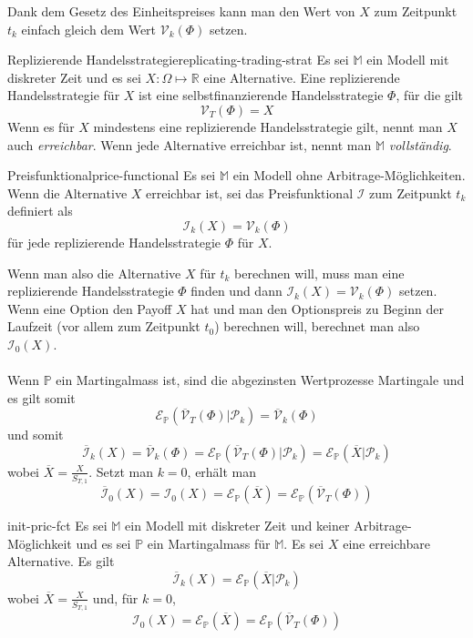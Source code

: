 \documentclass[11pt]{report} %
\begin{document}
Dank dem Gesetz des Einheitspreises kann man den Wert von $X$ zum Zeitpunkt $t_k$ einfach gleich dem Wert $\mathcal{V}_k(\Phi)$ setzen.
\begin{Definition}{Replizierende Handelsstrategie}{replicating-trading-strat}
    Es sei $\mathbb{M}$ ein Modell mit diskreter Zeit und es sei $X:\Omega \mapsto \mathbb{R}$ eine Alternative. Eine replizierende Handelsstrategie für $X$ ist eine selbstfinanzierende Handelsstrategie $\Phi$, für die gilt $$\mathcal{V}_T(\Phi)=X$$Wenn es für $X$ mindestens eine replizierende Handelsstrategie gilt, nennt man $X$ auch \textit{erreichbar}. Wenn jede Alternative erreichbar ist, nennt man $\mathbb{M}$ \textit{vollständig}.
\end{Definition}
\begin{Definition}{Preisfunktional}{price-functional}
    Es sei $\mathbb{M}$ ein Modell ohne Arbitrage-Möglichkeiten. Wenn die Alternative $X$ erreichbar ist, sei das Preisfunktional $\mathcal{I}$ zum Zeitpunkt $t_k$ definiert als $$\mathcal{I}_k(X)=\mathcal{V}_k(\Phi)$$ für jede replizierende Handelsstrategie $\Phi$ für $X$.
\end{Definition}
Wenn man also die Alternative $X$ für $t_k$ berechnen will, muss man eine replizierende Handelsstrategie $\Phi$ finden und dann $\mathcal{I}_k(X)=\mathcal{V}_k(\Phi)$ setzen. Wenn eine Option den Payoff $X$ hat und man den Optionspreis zu Beginn der Laufzeit (vor allem zum Zeitpunkt $t_0$) berechnen will, berechnet man also $\mathcal{I}_0(X)$.\\\\Wenn $\mathbb{P}$ ein Martingalmass ist, sind die abgezinsten Wertprozesse Martingale und es gilt somit $$\mathcal{E}_\mathbb{P}(\overline{\mathcal{V}}_T(\Phi)|\mathcal{P}_k)=\overline{\mathcal{V}}_k(\Phi)$$ und somit 
$$\overline{\mathcal{I}}_k(X)=\overline{\mathcal{V}}_k(\Phi)=\mathcal{E}_\mathbb{P}(\overline{\mathcal{V}}_T(\Phi)|\mathcal{P}_k)=\mathcal{E}_\mathbb{P}(\overline{X}|\mathcal{P}_k)$$ wobei $\displaystyle \overline{X}=\frac{X}{S_{T, 1}}$. Setzt man $k=0$, erhält man $$\overline{\mathcal{I}}_0(X)=\mathcal{I}_0(X)=\mathcal{E}_\mathbb{P}(\overline{X})=\mathcal{E}_\mathbb{P}(\overline{\mathcal{V}}_T(\Phi))$$
\begin{Theorem}{}{init-pric-fct}
    Es sei $\mathbb{M}$ ein Modell mit diskreter Zeit und keiner Arbitrage-Möglichkeit und es sei $\mathbb{P}$ ein Martingalmass für $\mathbb{M}$. Es sei $X$ eine erreichbare Alternative. Es gilt
    $$\overline{\mathcal{I}}_k(X)=\mathcal{E}_\mathbb{P}(\overline{X}|\mathcal{P}_k)$$ wobei $\displaystyle \overline{X}=\frac{X}{S_{T, 1}}$ und, für $k=0$, $$\mathcal{I}_0(X)=\mathcal{E}_\mathbb{P}(\overline{X})=\mathcal{E}_\mathbb{P}(\overline{\mathcal{V}}_T(\Phi))$$
\end{Theorem}
\end{document}
